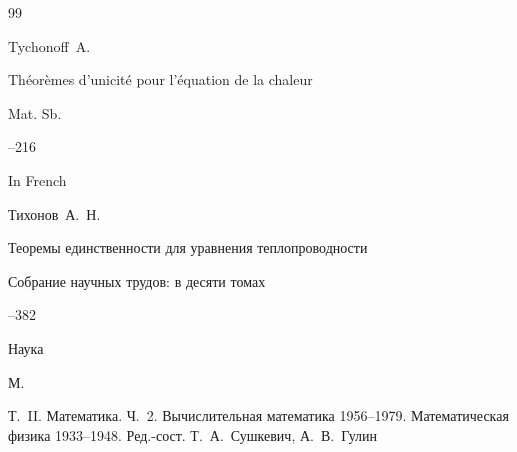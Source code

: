 \begin{thebibliography}{99}

\by Tychonoff~A.

\paper Th\'eor\`emes d'unicit\'e pour l'\'equation de la chaleur

\jour Mat. Sb.




--216

\lang In French







\by Тихонов~А.~Н.

\paper Теоремы единственности для уравнения теплопроводности

\inbook Собрание научных трудов: в десяти томах


--382

\publ Наука

\publaddr М.

\volinfo Т.~II. Математика. Ч.~2. Вычислительная математика 1956--1979. Математическая физика 1933--1948. Ред.-сост. Т.~А.~Сушкевич, А.~В.~Гулин


















\end{thebibliography}

